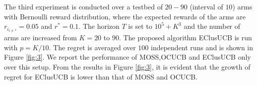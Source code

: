 	The third experiment is conducted over a testbed of $20-90$ (interval of $10$) arms with Bernoulli reward distribution, where the expected rewards of the arms are $r_{i_{{i}\neq {*}}}=0.05$ and $r^{*}=0.1$. The horizon $T$ is set to $10^{5} + K^{3}$ and the number of arms are increased from $K=20$ to $90$. The proposed algorithm EClusUCB is run with $p=K/10$. The regret is averaged over $100$ independent runs and is shown in Figure \ref{fig:3}. We report the performance of MOSS,OCUCB and EClusUCB only over this setup. From the results in Figure \ref{fig:3}, it is evident that the growth of regret for EClusUCB is lower than that of MOSS and OCUCB. 


